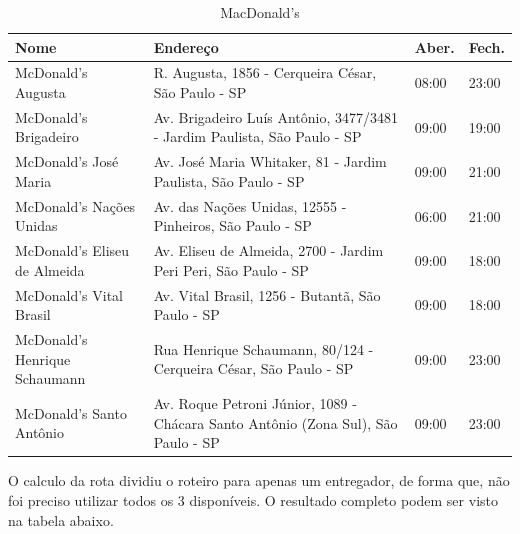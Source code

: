 \begin{table}[h]
	\centering
	\caption{MacDonald's}
	\label{Roteiro3}
	\begin{tabular}{C{3cm}C{8cm}C{2cm}C{2cm}}
		\toprule
		Nome                     & Endereço                                                         & Aber. & Fech. \\ \midrule
		McDonald's Augusta            & R. Augusta, 1856 - Cerqueira César, São Paulo - SP                                & 08:00    & 23:00      \\
		McDonald's Brigadeiro         & Av. Brigadeiro Luís Antônio, 3477/3481 - Jardim Paulista, São Paulo - SP          & 09:00    & 19:00      \\
		McDonald's José Maria         & Av. José Maria Whitaker, 81 - Jardim Paulista, São Paulo - SP                     & 09:00    & 21:00      \\
		McDonald's Nações Unidas      & Av. das Nações Unidas, 12555 - Pinheiros, São Paulo - SP                          & 06:00    & 21:00      \\
		McDonald's Eliseu de Almeida  & Av. Eliseu de Almeida, 2700 - Jardim Peri Peri, São Paulo - SP                    & 09:00    & 18:00      \\
		McDonald's Vital Brasil       & Av. Vital Brasil, 1256 - Butantã, São Paulo - SP                                  & 09:00    & 18:00      \\
		McDonald's Henrique Schaumann & Rua Henrique Schaumann, 80/124 - Cerqueira César, São Paulo - SP                  & 09:00    & 23:00      \\
		McDonald's Santo Antônio      & Av. Roque Petroni Júnior, 1089 - Chácara Santo Antônio (Zona Sul), São Paulo - SP & 09:00    & 23:00 \\ \bottomrule
	\end{tabular}
\end{table}
O calculo da rota dividiu o roteiro para apenas um entregador, de forma que, não foi preciso utilizar todos os 3 disponíveis. O resultado completo podem ser visto na tabela abaixo.

\begin{center}
	\label{fig:MacDonalts-Entregador1}
\end{center}

